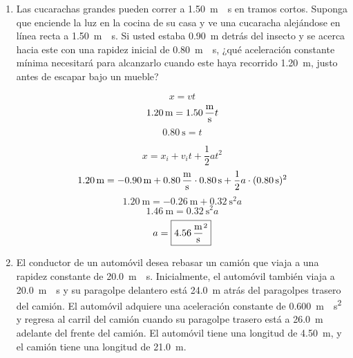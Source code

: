 \documentclass[Análisis.root.tex]{subfiles}
\begin{document}
\begin{enumerate}
  \item Las cucarachas grandes pueden correr a \SI{1,50}{\meter\over\second} en tramos cortos. Suponga que enciende la luz en la cocina de su casa y ve una cucaracha alejándose en línea recta a \SI{1,50}{\meter\over\second}. Si usted estaba \SI{0,90}{\meter} detrás del insecto y se acerca hacia este con una rapidez inicial de \SI{0,80}{\meter\over\second}, ¿qué aceleración constante mínima necesitará para alcanzarlo cuando este haya recorrido \SI{1,20}{\meter}, justo antes de escapar bajo un mueble?

        \[x=vt\]
        \[\SI{1,20}{\meter}=\SI{1,50}{\meter\over\second}t\]
        \[\SI{0,80}{\second}=t\]

        \[x=x_i+v_it+\frac{1}{2}at^2\]
        \[\SI{1,20}{\meter}=\SI{-0,90}{\meter}+\SI{0,80}{\meter\over\second}\cdot\SI{0,80}{\second}+\frac{1}{2}a\cdot(\SI{0,80}{\second})^2\]
        \[\SI{1,20}{\meter}=\SI{-0,26}{\meter}+\SI{0,32}{\second\squared}a\]
        \[\SI{1,46}{\meter}=\SI{0,32}{\second\squared}a\]
        \[a=\boxed{\SI{4,56}{\meter\over\second\squared}}\]

  \item El conductor de un automóvil desea rebasar un camión que viaja a una rapidez constante de \SI{20,0}{\meter\over\second}. Inicialmente, el automóvil también viaja a \SI{20,0}{\meter\over\second} y su paragolpe delantero está \SI{24,0}{\meter} atrás del paragolpes trasero del camión. El automóvil adquiere una aceleración constante de \SI{0,600}{\meter\over\second\squared} y regresa al carril del camión cuando su paragolpe trasero está a \SI{26,0}{\meter} adelante del frente del camión. El automóvil tiene una longitud de \SI{4,50}{\meter}, y el camión tiene una longitud de \SI{21,0}{\meter}.

        \begin{center}
        \end{center}


\end{enumerate}
\end{document}
